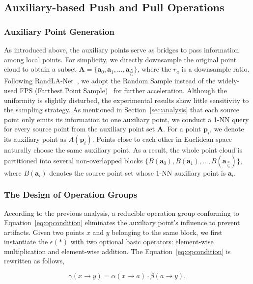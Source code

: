 \documentclass[journal]{IEEEtran}
\begin{document}
\subsection{Auxiliary-based Push and Pull Operations}
\subsubsection{Auxiliary Point Generation}
\label{sec:blockpart}
As introduced above, the auxiliary points serve as bridges to pass information among local points. For simplicity, we directly downsample the original point cloud to obtain a subset $\mathbf{A}=\{\mathbf{a}_0, \mathbf{a}_1,...,\mathbf{a}_{\frac{N}{r_a}}\}$, where the $r_a$ is a downsample ratio. Following RandLA-Net~\cite{randla}, we adopt the Random Sample instead of the widely-used FPS (Farthest Point Sample)~\cite{PointNet++} for further acceleration. Although the uniformity is slightly disturbed, the experimental results show 
little sensitivity to the sampling strategy. As mentioned in Section~\ref{sec:analysis} that each source point only emits its information to one auxiliary point, we conduct a 1-NN query for every source point from the auxiliary point set $\mathbf{A}$. For a point $\mathbf{p}_i$, we denote its auxiliary point as $A(\mathbf{p}_i)$. Points close to each other in Euclidean space naturally choose the same auxiliary point. As a result, the whole point cloud is partitioned into several non-overlapped blocks $\{B(\mathbf{a}_0), B(\mathbf{a}_1), ..., B(\mathbf{a}_{\frac{N}{r_a}})\}$, where $B(\mathbf{a}_i)$ denotes the source point set whose 1-NN auxiliary point is $\mathbf{a}_i$. 



\subsubsection{The Design of Operation Groups}
According to the previous analysis, a reducible operation group conforming to Equation~\ref{eq:opcondition} eliminates the auxiliary point's influence to prevent artifacts. Given two points $x$ and $y$ belonging to the same block, we first instantiate the $\epsilon(*)$ with two optional basic operators: element-wise multiplication and element-wise addition. The Equation~\ref{eq:opcondition} is rewritten as follows,

\begin{equation}
\label{eq:multiplication}
    \gamma(x\to y)=\alpha(x\to a)\cdot \beta(a\to y),
\end{equation}
\end{document}
